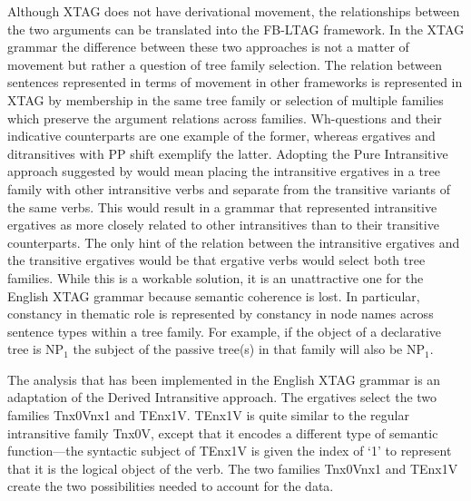 Although XTAG does not have derivational movement, the relationships
between the two arguments can be translated into the FB-LTAG framework.  In
the XTAG grammar the difference between these two approaches is not a
matter of movement but rather a question of tree family selection.  The
relation between sentences represented in terms of movement in other
frameworks is represented in XTAG by membership in the same tree family or
selection of multiple families which preserve the argument relations across
families. Wh-questions and their indicative counterparts are one example of
the former, whereas ergatives and ditransitives with PP shift exemplify the
latter.  Adopting the Pure Intransitive approach suggested by
\cite{Napoli88} would mean placing the intransitive ergatives in a tree
family with other intransitive verbs and separate from the transitive
variants of the same verbs.  This would result in a grammar that
represented intransitive ergatives as more closely related to other
intransitives than to their transitive counterparts.  The only hint of the
relation between the intransitive ergatives and the transitive ergatives
would be that ergative verbs would select both tree families. While this is
a workable solution, it is an unattractive one for the English XTAG grammar
because semantic coherence is lost.  In particular, constancy in thematic
role is represented by constancy in node names across sentence types within
a tree family. For example, if the object of a declarative tree is NP$_{1}$
the subject of the passive tree(s) in that family will also be NP$_{1}$.

The analysis that has been implemented in the English XTAG grammar is
an adaptation of the Derived Intransitive approach.  The ergatives
select the two families Tnx0Vnx1 and TEnx1V.  TEnx1V is quite similar
to the regular intransitive family Tnx0V, except that it encodes a
different type of semantic function---the syntactic subject of TEnx1V
is given the index of `1' to represent that it is the logical object
of the verb.  The two families Tnx0Vnx1 and TEnx1V create the two
possibilities needed to account for the data.

